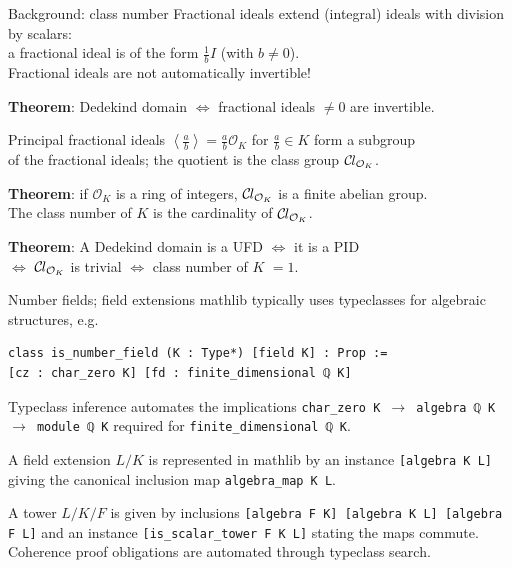 \documentclass{beamer}
\newcommand{\lean}[1]{\texttt{#1}\xspace}
\newcommand*{\OK}[1][K]{\mathcal{O}_{#1}}
\newcommand*{\Cl}{\mathcal{C}\kern-.075em l}
\newcommand{\mathlib}{\textsf{mathlib}\xspace}
\begin{document}
\begin{frame}{Background: class number}
	\alert{Fractional ideals} extend (integral) ideals with division by scalars:\\
	a fractional ideal is of the form $\frac{1}{b} I$ (with $b \ne 0$).\\
	\alert{Fractional ideals are not automatically invertible!}

\pause
	\textbf{Theorem}: Dedekind domain $\iff$ fractional ideals $\ne 0$ are invertible.

\pause
	Principal fractional ideals $\left\langle \frac{a}{b} \right\rangle = \frac{a}{b} \OK$ for $\frac{a}{b} \in K$ form a subgroup\\
	of the fractional ideals; the quotient is the \alert{class group} $\Cl_{\OK}$.

	\textbf{Theorem}: if $\OK$ is a ring of integers, $\Cl_{\OK}$ is a finite abelian group.\\
	The \alert{class number} of $K$ is the cardinality of $\Cl_{\OK}$.

\pause
	\textbf{Theorem}: A Dedekind domain is a UFD $\iff$ it is a PID\\
	$\iff$ $\Cl_{\OK}$ is trivial $\iff$ class number of $K$ $= 1$.
\end{frame}

\begin{frame}[fragile]{Number fields; field extensions}
	\mathlib typically uses typeclasses for algebraic structures, e.g.

\begin{lstlisting}
class is_number_field (K : Type*) [field K] : Prop :=
[cz : char_zero K] [fd : finite_dimensional ℚ K]
\end{lstlisting}

	Typeclass inference automates the implications \lean{char\_zero K $\to$ algebra ℚ K $\to$ module ℚ K}
	required for \lean{finite\_dimensional ℚ K}.

\pause

	A \alert{field extension} $L / K$ is represented in \mathlib by an instance \lean{[algebra K L]}
	giving the canonical inclusion map \lean{algebra\_map K L}.

\pause
	A tower $L / K / F$ is given by inclusions \lean{[algebra F K] [algebra K L] [algebra F L]}
	and an instance \lean{[is\_scalar\_tower F K L]} stating the maps commute.\\
	Coherence proof obligations are automated through typeclass search.
\end{frame}
\end{document}

